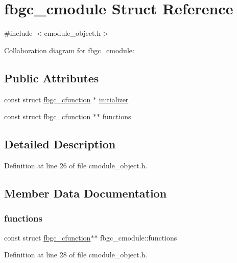 \hypertarget{structfbgc__cmodule}{}\section{fbgc\+\_\+cmodule Struct Reference}
\label{structfbgc__cmodule}


{\ttfamily \#include $<$cmodule\+\_\+object.\+h$>$}



Collaboration diagram for fbgc\+\_\+cmodule\+:
\subsection*{Public Attributes}
\begin{DoxyCompactItemize}
\item 
const struct \hyperlink{structfbgc__cfunction}{fbgc\+\_\+cfunction} $\ast$ \hyperlink{structfbgc__cmodule_a85dcae28e556a5b7360f323589071d04}{initializer}
\item 
const struct \hyperlink{structfbgc__cfunction}{fbgc\+\_\+cfunction} $\ast$$\ast$ \hyperlink{structfbgc__cmodule_a62545db586d766bb1a8027d65f3ab2f4}{functions}
\end{DoxyCompactItemize}


\subsection{Detailed Description}


Definition at line 26 of file cmodule\+\_\+object.\+h.



\subsection{Member Data Documentation}
\mbox{\label{structfbgc__cmodule_a62545db586d766bb1a8027d65f3ab2f4}} 
\subsubsection{\texorpdfstring{functions}{functions}}
{\footnotesize\ttfamily const struct \hyperlink{structfbgc__cfunction}{fbgc\+\_\+cfunction}$\ast$$\ast$ fbgc\+\_\+cmodule\+::functions}



Definition at line 28 of file cmodule\+\_\+object.\+h.

